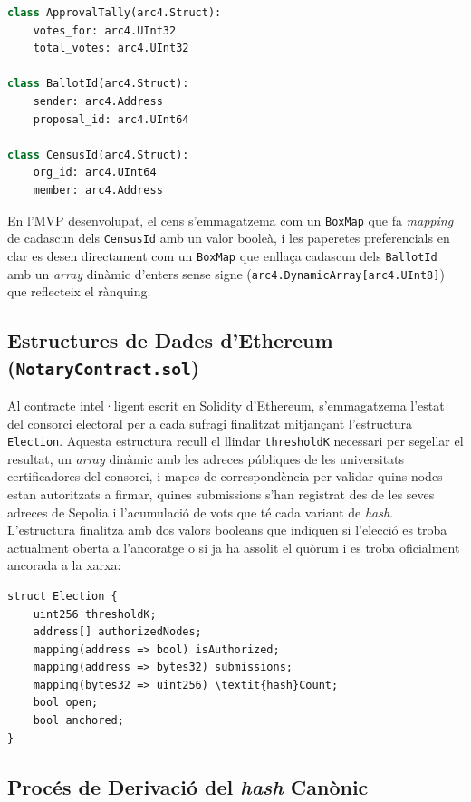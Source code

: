 \begin{lstlisting}[language=Python]
class ApprovalTally(arc4.Struct):
    votes_for: arc4.UInt32
    total_votes: arc4.UInt32

class BallotId(arc4.Struct):
    sender: arc4.Address
    proposal_id: arc4.UInt64

class CensusId(arc4.Struct):
    org_id: arc4.UInt64
    member: arc4.Address
\end{lstlisting}

En l'\ac{MVP} desenvolupat, el cens s'emmagatzema com un \texttt{BoxMap} que fa \textit{mapping} de cadascun dels
\texttt{CensusId} amb un valor booleà, i les paperetes preferencials en clar es desen directament com un \texttt{BoxMap}
que enllaça cadascun dels \texttt{BallotId} amb un \textit{array} dinàmic d'enters sense signe
(\texttt{arc4.DynamicArray[arc4.UInt8]}) que reflecteix el rànquing.

\subsection{Estructures de Dades d'Ethereum (\texttt{NotaryContract.sol})}
\label{subsec:estructs-ethereum}

Al contracte intel·ligent escrit en Solidity d'Ethereum, s'emmagatzema l'estat del consorci electoral per a cada sufragi
finalitzat mitjançant l'estructura \texttt{Election}.
Aquesta estructura recull el llindar \texttt{thresholdK} necessari per segellar el resultat, un \textit{array} dinàmic
amb les adreces públiques de les universitats certificadores del consorci, i mapes de correspondència per validar quins
nodes estan autoritzats a firmar, quines submissions s'han registrat des de les seves adreces de Sepolia i l'acumulació
de vots que té cada variant de \textit{hash}.
L'estructura finalitza amb dos valors booleans que indiquen si l'elecció es troba actualment oberta a l'ancoratge o si
ja ha assolit el quòrum i es troba oficialment ancorada a la xarxa:

\begin{verbatim}
struct Election {
    uint256 thresholdK;
    address[] authorizedNodes;
    mapping(address => bool) isAuthorized;
    mapping(address => bytes32) submissions;
    mapping(bytes32 => uint256) \textit{hash}Count;
    bool open;
    bool anchored;
}
\end{verbatim}

\subsection{Procés de Derivació del \textit{hash} Canònic}
\label{subsec:derivacio-hash}

